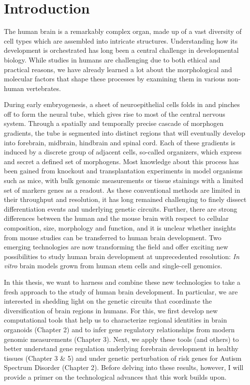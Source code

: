 \thispagestyle{plain}
\section{Introduction}




The human brain is a remarkably complex organ, made up of a vast diversity of cell types which are assembled into intricate structures. Understanding how its development is orchestrated has long been a central challenge in developmental biology. While studies in humans are challenging due to both ethical and practical reasons, we have already learned a lot about the morphological and molecular factors that shape these processes by examining them in various non-human vertebrates.

During early embryogenesis, a sheet of neuroepithelial cells folds in and pinches off to form the neural tube, which gives rise to most of the central nervous system. Through a spatially and temporally precise cascade of morphogen gradients, the tube is segmented into distinct regions that will eventually develop into forebrain, midbrain, hindbrain and spinal cord. Each of these gradients is induced by a discrete group of adjacent cells, so-called organizers, which express and secret a defined set of morphogens. Most knowledge about this process has been gained from knockout and transplantation experiments in model organisms such as mice, with bulk genomic measurements or tissue stainings with a limited set of markers genes as a readout. As these conventional methods are limited in their throughput and resolution, it has long remained challenging to finely dissect differentiation events and underlying genetic circuits. Further, there are strong differences between the human and the mouse brain with respect to cellular composition, size, morphology and function, and it is unclear whether insights from mouse studies can be transferred to human brain development. Two emerging technologies are now transforming the field and offer exciting new possibilities to study human brain development at unprecedented resolution: ​\textit{In vitro} brain models grown from human stem cells and single-cell genomics.

In this thesis, we want to harness and combine these new technologies to take a fresh approach to the study of human brain development. In particular, we are interested in shedding light on the genetic circuits that coordinate the diversification of brain regions in humans. For this, we first develop new computational tools that help us to characterize regional identities in brain organoids (Chapter 2) and to infer gene regulatory relationships from modern genomic measurements (Chapter 3). Next, we apply these tools (and others) to better understand gene regulation underlying forebrain development in healthy tissues (Chapter 3 \& 5) and under genetic perturbation of risk genes for Autism Spectrum Disorder (Chapter 2). Before delving into these results, however, I will provide a primer on the technological advances that this work builds upon.

